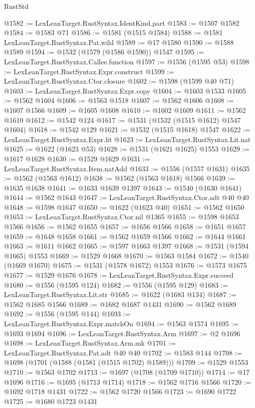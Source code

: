 \begin{lexlean}{RustStd}
\begin{coremodule}
{\begin{coremodule}
{{{{{{{{{{{{{{{{{{{{{{{{{{{{{{{{@1582 := LexLeanTarget.RustSyntax.IdentKind.part
@1583 := @1507 @1582
@1584 := @1583 @71
@1586 := @1581 (@1515 @1584)
@1588 := @1581 LexLeanTarget.RustSyntax.Pat.wild
@1589 := @17 @1580
@1590 := @1588 @1589
@1594 := @1532 (@1579 (@1586 @1590)) @1547
@1595 := LexLeanTarget.RustSyntax.Callee.function
@1597 := @1556 (@1595 @53)
@1598 := LexLeanTarget.RustSyntax.Expr.construct
@1599 := LexLeanTarget.RustSyntax.Ctor.closure
@1602 := @1598 (@1599 @40 @71)
@1603 := LexLeanTarget.RustSyntax.Expr.copy
@1604 := @1603 @1533
@1605 := @1562 @1604
@1606 := @1563 @1518
@1607 := @1562 @1606
@1608 := @1607 @1566
@1609 := @1605 @1608
@1610 := @1602 @1609
@1611 := @1562 @1610
@1612 := @1542 @124
@1617 := @1531 (@1532 (@1515 @1612) @1547 @1604)
@1618 := @1542 @129
@1621 := @1532 (@1515 @1618) @1547
@1622 := LexLeanTarget.RustSyntax.Expr.lit
@1623 := LexLeanTarget.RustSyntax.Lit.nat
@1625 := @1622 (@1623 @53)
@1628 := @1531 (@1621 @1625) @1553
@1629 := @1617 @1628
@1630 := @1529 @1629
@1631 := LexLeanTarget.RustSyntax.Item.natAdd
@1633 := @1556 (@1557 @1631)
@1635 := @1562 (@1563 @1612)
@1638 := @1562 (@1563 @1618) @1566
@1639 := @1635 @1638
@1641 := @1633 @1639 @1397
@1643 := @1540 (@1630 @1641)
@1644 := @1562 @1643
@1647 := LexLeanTarget.RustSyntax.Ctor.adt @40 @40
@1648 := @1598 @1647
@1650 := @1622 (@1623 @40)
@1651 := @1562 @1650
@1653 := LexLeanTarget.RustSyntax.Ctor.nil @1365
@1655 := @1598 @1653 @1566
@1656 := @1562 @1655
@1657 := @1656 @1566
@1658 := @1651 @1657
@1659 := @1648 @1658
@1661 := @1562 @1659 @1566
@1662 := @1644 @1661
@1663 := @1611 @1662
@1665 := @1597 @1663 @1397
@1668 := @1531 (@1594 @1665) @1553
@1669 := @1529 @1668
@1670 := @1563 @1584
@1672 := @1540 (@1669 @1670)
@1675 := @1531 (@1578 @1672) @1553
@1676 := @1573 @1675
@1677 := @1529 @1676
@1678 := LexLeanTarget.RustSyntax.Expr.succeed
@1680 := @1556 (@1595 @124)
@1682 := @1556 (@1595 @129)
@1683 := LexLeanTarget.RustSyntax.Lit.str
@1685 := @1622 (@1683 @134)
@1687 := @1562 @1685 @1566
@1689 := @1682 @1687 @1431
@1690 := @1562 @1689
@1692 := @1556 (@1595 @144)
@1693 := LexLeanTarget.RustSyntax.Expr.matchOn
@1694 := @1563 @1574
@1695 := @1693 @1694
@1696 := LexLeanTarget.RustSyntax.Arm
@1697 := @2 @1696
@1698 := LexLeanTarget.RustSyntax.Arm.mk
@1701 := LexLeanTarget.RustSyntax.Pat.adt @40 @40
@1702 := @1583 @144
@1708 := @1698 (@1701 (@1588 (@1581 (@1515 @1702) @1589)))
@1709 := @1529 @1553
@1710 := @1563 @1702
@1713 := @1697 (@1708 (@1709 @1710))
@1714 := @17 @1696
@1716 := @1695 (@1713 @1714)
@1718 := @1562 @1716 @1566
@1720 := @1692 @1718 @1431
@1722 := @1562 @1720 @1566
@1723 := @1690 @1722
@1725 := @1680 @1723 @1431
}}}}}}}}}}}}}}}}}}}}}}}}}}}}}}}}
\end{coremodule}}
\end{coremodule}
\end{lexlean}
